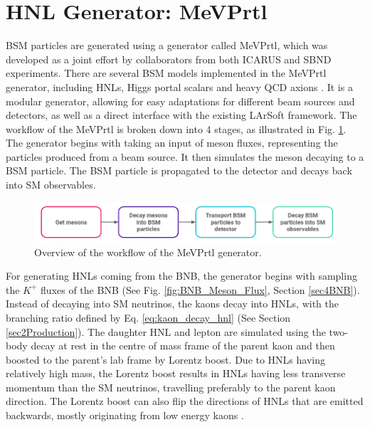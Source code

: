 \section{HNL Generator: MeVPrtl}
\label{sec:gen_mevprtl}

BSM particles are generated using a generator called MeVPrtl, which was developed as a joint effort by collaborators from both ICARUS and SBND experiments.
There are several BSM models implemented in the MeVPrtl generator, including HNLs, Higgs portal scalars \cite{higgs_scalar} and heavy QCD axions \cite{qcd_axion}.
It is a modular generator, allowing for easy adaptations for different beam sources and detectors, as well as a direct interface with the existing LArSoft framework.
The workflow of the MeVPrtl is broken down into 4 stages, as illustrated in Fig. \ref{fig:MeVPrtl_Workflow}.
The generator begins with taking an input of meson fluxes, representing the particles produced from a beam source.
It then simulates the meson decaying to a BSM particle.
The BSM particle is propagated to the detector and decays back into SM observables.

\begin{figure}[htbp!] 
\centering    
\includegraphics[width=1.0\textwidth]{MeVPrtl_Workflow}
\caption[MeVPrtl Generator Workflow]{
Overview of the workflow of the MeVPrtl generator.
}
\label{fig:MeVPrtl_Workflow}
\end{figure}

For generating HNLs coming from the BNB, the generator begins with sampling the $K^{+}$ fluxes of the BNB (See Fig. \ref{fig:BNB_Meson_Flux}, Section \ref{sec4BNB}).
Instead of decaying into SM neutrinos, the kaons decay into HNLs, with the branching ratio defined by Eq. \ref{eq:kaon_decay_hnl} (See Section \ref{sec2Production}).
The daughter HNL and lepton are simulated using the two-body decay at rest in the centre of mass frame of the parent kaon and then boosted to the parent's lab frame by Lorentz boost.
Due to HNLs having relatively high mass, the Lorentz boost results in HNLs having less transverse momentum than the SM neutrinos, travelling preferably to the parent kaon direction.
The Lorentz boost can also flip the directions of HNLs that are emitted backwards, mostly originating from low energy kaons \cite{DavidePhD}.

